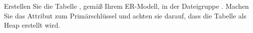 \item Erstellen Sie die Tabelle , gemäß Ihrem ER-Modell, in der
Dateigruppe . Machen Sie das Attribut  zum
Primärschlüssel und achten sie darauf, dass die Tabelle als Heap erstellt wird.
